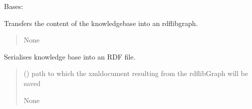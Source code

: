 \documentclass[letterpaper,10pt,english]{sphinxmanual}
\begin{document}
\begin{fulllineitems}
\label{\detokenize{medextractor.rdf:medextractor.rdf.RDFSerialiser.RDFSerialiser}}
\pysigstartsignatures
{}
\pysigstopsignatures
\sphinxAtStartPar
Bases: 

\begin{fulllineitems}
\label{\detokenize{medextractor.rdf:medextractor.rdf.RDFSerialiser.RDFSerialiser.knowledgebase_to_graph}}
\pysigstartsignatures
{}
\pysigstopsignatures
\sphinxAtStartPar
Transfers the content of the knowledgebase into an rdflib\sphinxhyphen{}graph.
\begin{quote}\begin{description}
\sphinxAtStartPar
{} \textendash{} 

\sphinxAtStartPar
None

\end{description}\end{quote}

\end{fulllineitems}


\begin{fulllineitems}
\label{\detokenize{medextractor.rdf:medextractor.rdf.RDFSerialiser.RDFSerialiser.serialise_knowledgebase}}
\pysigstartsignatures
{}
\pysigstopsignatures
\sphinxAtStartPar
Serialises knowledge base into an RDF file.
\begin{quote}\begin{description}
\sphinxAtStartPar
{} () \textendash{} path to which the xml\sphinxhyphen{}document resulting from the rdflib\sphinxhyphen{}Graph will be saved

\sphinxAtStartPar
None

\end{description}\end{quote}

\end{fulllineitems}


\end{fulllineitems}
\end{document}
